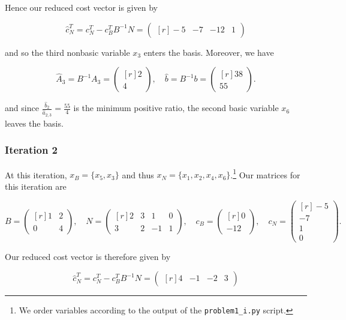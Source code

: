 \begin{solution}
  Hence our reduced cost vector is given by 

  $$
  \hat{c}_N^T = c_N^T - c_B^T B^{-1} N = \begin{pmatrix*}[r]
    -5 & -7 & -12 & 1
  \end{pmatrix*}
  $$

  and so the third nonbasic variable $x_3$ enters the basis. Moreover, we have
  
  $$
  \hat{A}_3 = B^{-1} A_3 = \begin{pmatrix*}[r]
    2  \\
    4
  \end{pmatrix*}, \quad \hat{b} = B^{-1} b = \begin{pmatrix*}[r]
    38  \\
    55
  \end{pmatrix*}.
  $$

  and since $\frac{\hat{b}_2}{\hat{a}_{2,3}} = \frac{55}{4}$ is the minimum positive ratio, the second basic variable 
  $x_6$ leaves the basis.

  \subsubsection*{Iteration 2}
  At this iteration, $x_B = \{x_5, x_3\}$ and thus $x_N = \{x_1, x_2, x_4, x_6\}$.\footnote{
    We order variables according to the output of the \texttt{problem1\_i.py} script.
  }
  Our matrices for this iteration are

  $$
    B = \begin{pmatrix*}[r]
      1 & 2 \\
      0 & 4
    \end{pmatrix*}, \quad N = \begin{pmatrix*}[r]
      2 & 3 &  1 & 0 \\
      3 & 2 & -1 & 1
    \end{pmatrix*}, \quad c_B = \begin{pmatrix*}[r]
      0 \\
     -12
    \end{pmatrix*}, \quad c_N = \begin{pmatrix*}[r]
     -5  \\
     -7  \\
      1  \\
      0
    \end{pmatrix*}.
  $$

  Our reduced cost vector is therefore given by 

  $$
  \hat{c}_N^T = c_N^T - c_B^T B^{-1} N = \begin{pmatrix*}[r]
     4 & -1 & -2 & 3
  \end{pmatrix*}
  $$


\end{solution}
